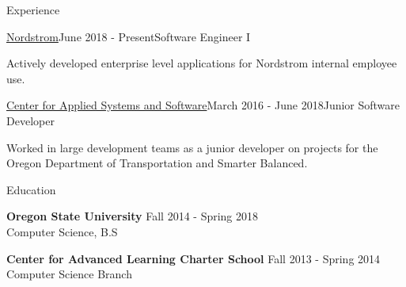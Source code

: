 \documentclass{resume} %
\begin{document}

\begin{rSection}{Experience}
  
  \begin{rSubsection}{\href{http://www.nordstrom.com/}{Nordstrom}}{June 2018 - Present}{Software Engineer I}{}
  \item Actively developed enterprise level applications for Nordstrom internal employee use.
  \end{rSubsection}

  \begin{rSubsection}{\href{http://cass.oregonstate.edu/}{Center for Applied Systems and Software}}{March 2016 - June 2018}{Junior Software Developer}{}
  \item Worked in large development teams as a junior developer on projects for the Oregon  Department of Transportation and Smarter Balanced.
  \end{rSubsection}

\end{rSection}


\begin{rSection}{Education}

{\bf Oregon State University} \hfill {Fall 2014 - Spring 2018} 
\\ Computer Science, B.S

{\bf Center for Advanced Learning Charter School} \hfill {Fall 2013 - Spring 2014} 
\\ Computer Science Branch

\end{rSection}
\end{document}
